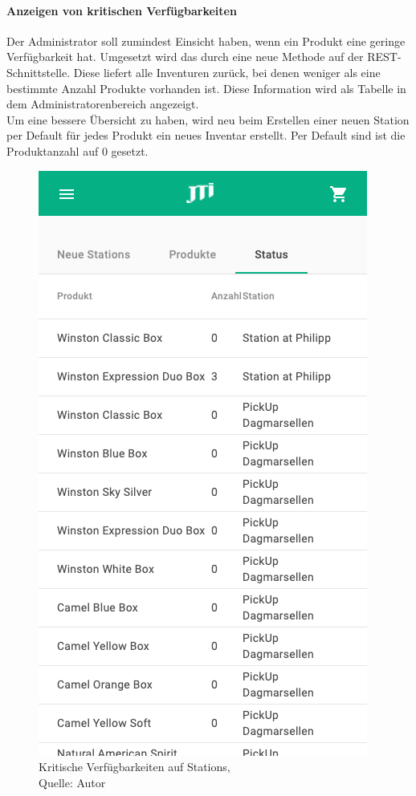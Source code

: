\paragraph{Anzeigen von kritischen Verfügbarkeiten}
Der Administrator soll zumindest Einsicht haben, wenn ein Produkt eine geringe Verfügbarkeit hat. Umgesetzt wird das durch eine neue Methode auf der \ac{REST}-Schnittstelle. Diese liefert alle Inventuren zurück, bei denen weniger als eine bestimmte Anzahl Produkte vorhanden ist. Diese Information wird als Tabelle in dem Administratorenbereich angezeigt. \\
Um eine bessere Übersicht zu haben, wird neu beim Erstellen einer neuen Station per Default für jedes Produkt ein neues Inventar erstellt. Per Default sind ist die Produktanzahl auf 0 gesetzt. 
\begin{figure}[H]
	\centering
	\includegraphics[scale=0.1]{images/stationStatus.png}
	\caption[Kritische Verfügbarkeiten auf Stations]{Kritische Verfügbarkeiten auf Stations,\\ Quelle: Autor}
	\label{img: stationStatus}
\end{figure} 

